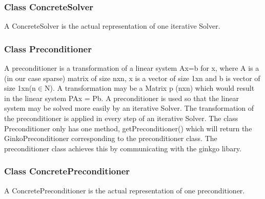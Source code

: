 \documentclass[parskip=full]{scrartcl}
\begin{document}
\subsubsection{Class ConcreteSolver}
A ConcreteSolver is the actual representation of one iterative Solver. 
\subsubsection{Class Preconditioner}
A preconditioner is a transformation of a linear system Ax=b for x, where A is a (in our case sparse) matrix of size nxn, x is a vector of size 1xn and b is vector of size 1xn(n$\in$N). A transformation may be a Matrix p (nxn) which would result in the linear system PAx = Pb. A preconditioner is used so that the linear system may be solved more easily by an iterative Solver. The transformation of the preconditioner is applied in every step of an iterative Solver. \newline\newline
The class Preconditioner only has one method, getPreconditioner() which will return the GinkoPreconditioner corresponding to the preconditioner class. The preconditioner class achieves this by communicating with the ginkgo libary. 
\subsubsection{Class ConcretePreconditioner}
A ConcretePreconditioner is the actual representation of one preconditioner.
\end{document}
